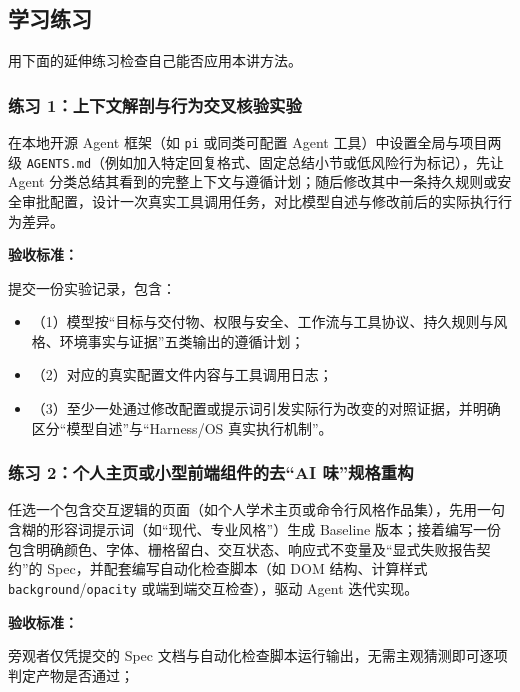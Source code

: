 \documentclass[UTF8,a4paper,11pt,fontset=fandol]{ctexart}
\begin{document}
\subsection{学习练习}

用下面的延伸练习检查自己能否应用本讲方法。

\subsubsection*{练习 1：上下文解剖与行为交叉核验实验}

在本地开源 Agent 框架（如 \texttt{pi} 或同类可配置 Agent 工具）中设置全局与项目两级 \texttt{AGENTS.md}（例如加入特定回复格式、固定总结小节或低风险行为标记），先让 Agent 分类总结其看到的完整上下文与遵循计划；随后修改其中一条持久规则或安全审批配置，设计一次真实工具调用任务，对比模型自述与修改前后的实际执行行为差异。

\par{}\textbf{验收标准：}

提交一份实验记录，包含：

\begin{itemize}
\item （1）模型按“目标与交付物、权限与安全、工作流与工具协议、持久规则与风格、环境事实与证据”五类输出的遵循计划；

\item （2）对应的真实配置文件内容与工具调用日志；

\item （3）至少一处通过修改配置或提示词引发实际行为改变的对照证据，并明确区分“模型自述”与“Harness/OS 真实执行机制”。
\end{itemize}

\subsubsection*{练习 2：个人主页或小型前端组件的去“AI 味”规格重构}

任选一个包含交互逻辑的页面（如个人学术主页或命令行风格作品集），先用一句含糊的形容词提示词（如“现代、专业风格”）生成 Baseline 版本；接着编写一份包含明确颜色、字体、栅格留白、交互状态、响应式不变量及“显式失败报告契约”的 Spec，并配套编写自动化检查脚本（如 DOM 结构、计算样式 \texttt{background}/\texttt{opacity} 或端到端交互检查），驱动 Agent 迭代实现。

\par{}\textbf{验收标准：}

旁观者仅凭提交的 Spec 文档与自动化检查脚本运行输出，无需主观猜测即可逐项判定产物是否通过；
\end{document}
